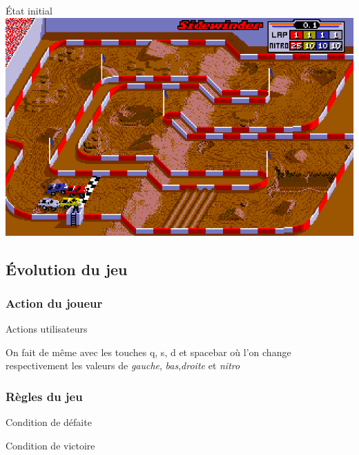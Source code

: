 \documentclass[10pt,dvipsnames,final]{beamer}
\begin{document}
\begin{frame}{État initial}
\includegraphics[width=\textwidth]{presentationfiles/initial-state-sof} 
\end{frame}

\subsection{Évolution du jeu}

\subsubsection{Action du joueur}

\begin{frame}{Actions utilisateurs}


On fait de même avec les touches q, s, d et spacebar où l'on change respectivement les valeurs de \emph{gauche}, \emph{bas},\emph{droite} et \emph{nitro}


\end{frame}

\subsubsection{Règles du jeu}

\begin{frame}{Condition de défaite}

\end{frame}

\begin{frame}{Condition de victoire}

\end{frame}
\end{document}
